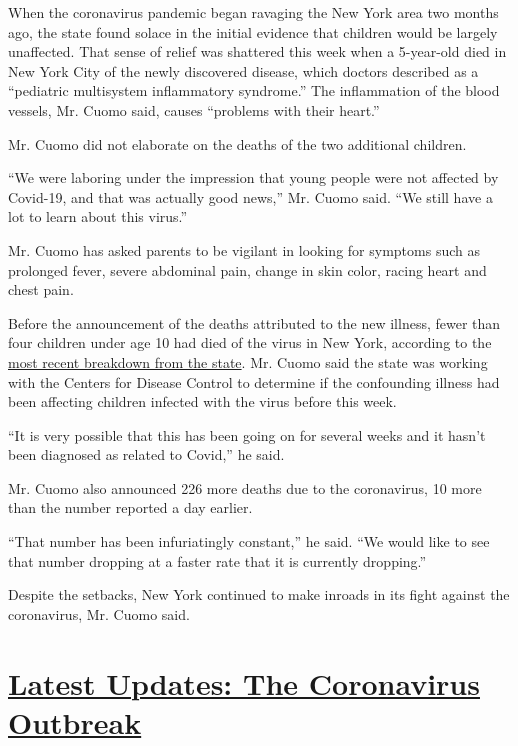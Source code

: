 When the coronavirus pandemic began ravaging the New York area two
months ago, the state found solace in the initial evidence that children
would be largely unaffected. That sense of relief was shattered this
week when a 5-year-old died in New York City of the newly discovered
disease, which doctors described as a ``pediatric multisystem
inflammatory syndrome.'' The inflammation of the blood vessels, Mr.
Cuomo said, causes ``problems with their heart.''

Mr. Cuomo did not elaborate on the deaths of the two additional
children.

``We were laboring under the impression that young people were not
affected by Covid-19, and that was actually good news,'' Mr. Cuomo said.
``We still have a lot to learn about this virus.''

Mr. Cuomo has asked parents to be vigilant in looking for symptoms such
as prolonged fever, severe abdominal pain, change in skin color, racing
heart and chest pain.

Before the announcement of the deaths attributed to the new illness,
fewer than four children under age 10 had died of the virus in New York,
according to the
\href{https://covid19tracker.health.ny.gov/views/NYS-COVID19-Tracker/NYSDOHCOVID-19Tracker-Fatalities?\%3Aembed=yes\&\%3Atoolbar=no\&\%3Atabs=n}{most
recent breakdown from the state}. Mr. Cuomo said the state was working
with the Centers for Disease Control to determine if the confounding
illness had been affecting children infected with the virus before this
week.

``It is very possible that this has been going on for several weeks and
it hasn't been diagnosed as related to Covid,'' he said.

Mr. Cuomo also announced 226 more deaths due to the coronavirus, 10 more
than the number reported a day earlier.

``That number has been infuriatingly constant,'' he said. ``We would
like to see that number dropping at a faster rate that it is currently
dropping.''

Despite the setbacks, New York continued to make inroads in its fight
against the coronavirus, Mr. Cuomo said.

\hypertarget{latest-updates-the-coronavirus-outbreak}{%
\section{\texorpdfstring{\href{https://www.nytimes3xbfgragh.onion/2020/08/21/world/covid-19-coronavirus.html?action=click\&pgtype=Article\&state=default\&region=MAIN_CONTENT_1\&context=storylines_live_updates}{Latest
Updates: The Coronavirus
Outbreak}}{Latest Updates: The Coronavirus Outbreak}}\label{latest-updates-the-coronavirus-outbreak}}

